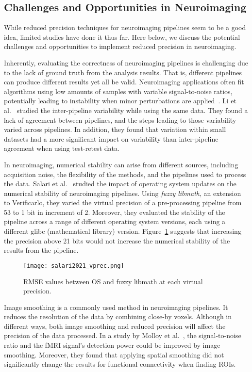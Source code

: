 \subsection{Challenges and Opportunities in Neuroimaging}
While reduced precision techniques for neuroimaging pipelines seem to be a
good idea, limited studies have done it thus far.
Here below, we discuss the potential challenges and opportunities to implement
reduced precision in neuroimaging.
	
Inherently, evaluating the correctness of neuroimaging pipelines is challenging due to the lack of ground truth from the analysis results.
That is, different pipelines can produce different results yet all be valid.
Neuroimaging applications often fit algorithms using low amounts of samples with variable
signal-to-noise ratios, potentially leading to instability when minor perturbations are applied~\cite{Kiar2020-uv}.
Li et al.~\cite{Li2021-om} studied the inter-pipeline variability while using the same data.
They found a lack of agreement between pipelines, and the steps leading to those variability varied across pipelines.
In addition, they found that variation within small datasets had a more significant impact
on variability than inter-pipeline agreement when using test-retest data. 
	
In neuroimaging, numerical stability can arise from different sources, including
acquisition noise, the flexibility of the methods, and the pipelines used to process the data.
Salari et al.~\cite{Salari2021-kd} studied the impact of operating system updates on
the numerical stability of neuroimaging pipelines.
Using \textit{fuzzy libmath}, an extension to Verificarlo, they varied the virtual
precision of a pre-processing pipeline from 53 to 1 bit in increment of 2.
Moreover, they evaluated the stability of the pipeline across a range of different
operating system versions, each using a different glibc (mathematical library) version.
Figure~\ref{fig:salari2021_vprec} suggests that increasing the precision above 21 bits
would not increase the numerical stability of the results from the pipeline.
\begin{figure}[h]
	\centering
	\texttt{[image: salari2021\_vprec.png]}
	\caption{RMSE values between OS and fuzzy libmath at each virtual precision.}
	\label{fig:salari2021_vprec}
\end{figure}
	
Image smoothing is a commonly used method in neuroimaging pipelines.
It reduces the resolution of the data by combining close-by voxels.
Although in different ways, both image smoothing and reduced precision will affect
the precision of the data processed.
In a study by Molloy et al.~\cite{Molloy2014-oc}, the signal-to-noise ratio and
the fMRI signal's detection power could be improved by image smoothing. 
Moreover, they found that applying spatial smoothing did not significantly change the
results for functional connectivity when finding ROIs.
	

